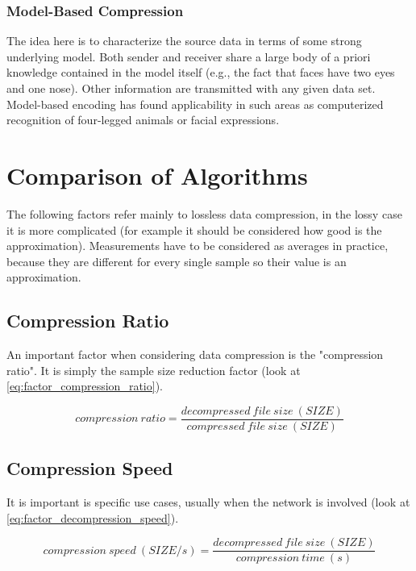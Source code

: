 \documentclass[12pt, a4paper]{report}
\begin{document}
\subsubsection{Model-Based Compression}

The idea here is to characterize the source data in terms of some strong underlying model.
Both sender and receiver share a large body of a priori knowledge contained in the model itself (e.g., the fact that faces have
two eyes and one nose).
Other information are transmitted with any given data set.
Model-based encoding has found applicability in such areas as computerized recognition of four-legged animals or facial
expressions.

\section{Comparison of Algorithms}

The following factors refer mainly to lossless data compression, in the lossy case it is more complicated (for example it should
be considered how good is the approximation).
Measurements have to be considered as averages in practice, because they are different for every single sample so their value is
an approximation.

\subsection{Compression Ratio}

An important factor when considering data compression is the "compression ratio". It is simply the sample size reduction factor
(look at \autoref{eq:factor_compression_ratio}).

\begin{equation} \label{eq:factor_compression_ratio}
  compression\ ratio = \frac{decompressed\ file\ size\ (SIZE)}{compressed\ file\ size\ (SIZE)}
\end{equation}

\subsection{Compression Speed}

It is important is specific use cases, usually when the network is involved (look at \autoref{eq:factor_decompression_speed}).

\begin{equation} \label{eq:factor_compression_speed}
  compression\ speed\ (SIZE / s) = \frac{decompressed\ file\ size\ (SIZE)}{compression\ time\ (s)}
\end{equation}
\end{document}
